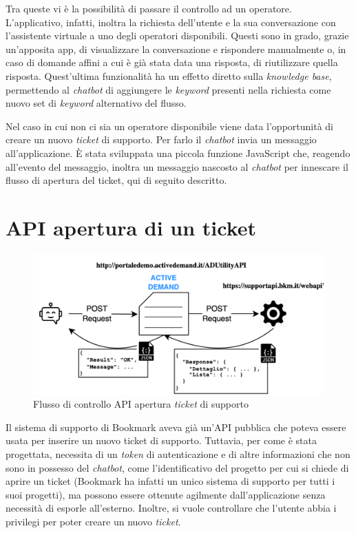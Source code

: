 Tra queste vi è la possibilità di passare il controllo ad un operatore. L'applicativo, infatti, inoltra la richiesta dell'utente e la sua conversazione con l'assistente virtuale a uno degli operatori disponibili. 
%
Questi sono in grado, grazie un'apposita app, di visualizzare la conversazione e rispondere manualmente o, in caso di domande affini a cui è già stata data una risposta, di riutilizzare quella risposta. 
%
Quest'ultima funzionalità ha un effetto diretto sulla \textit{knowledge base}, permettendo al \textit{chatbot} di aggiungere le \textit{keyword} presenti nella richiesta come nuovo set di \textit{keyword} alternativo del flusso.

Nel caso in cui non ci sia un operatore disponibile viene data l'opportunità di creare un nuovo \textit{ticket} di supporto.
%
Per farlo il \textit{chatbot} invia un messaggio all'applicazione. 
%
\`E stata sviluppata una piccola funzione JavaScript che, reagendo all'evento del messaggio, inoltra un messaggio nascosto al \textit{chatbot} per innescare il flusso di apertura del ticket, qui di seguito descritto.

\section{API apertura di un ticket}

\begin{figure}[h]
    \centering{}
    \includegraphics*[width=\textwidth]{./img/api-flow.png}
    \caption{Flusso di controllo API apertura \textit{ticket} di supporto}
    \label{fig:api-flow}
\end{figure}

Il sistema di supporto di Bookmark aveva già un'API pubblica che poteva essere usata per inserire un nuovo ticket di supporto. 
%
Tuttavia, per come è stata progettata, necessita di un \textit{token} di autenticazione e di altre informazioni che non sono in possesso del \textit{chatbot}, come l'identificativo del progetto per cui si chiede di aprire un ticket (Bookmark ha infatti un unico sistema di supporto per tutti i suoi progetti), ma possono essere ottenute agilmente dall'applicazione senza necessità di esporle all'esterno.
%
Inoltre, si vuole controllare che l'utente abbia i privilegi per poter creare un nuovo \textit{ticket}.


